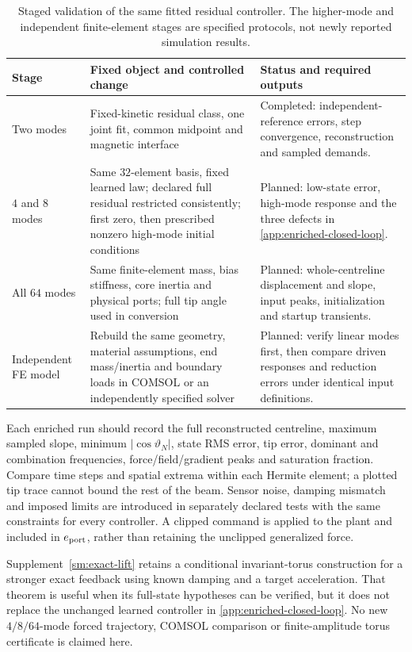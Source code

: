 \begin{table}[t]
\centering\small
\caption{Staged validation of the same fitted residual controller.
The higher-mode and independent finite-element stages are specified
protocols, not newly reported simulation results.}
\label{app:validation-stages}
\begin{tabular}{p{}p{}p{}}
\toprule
Stage & Fixed object and controlled change & Status and required outputs\\
\midrule
Two modes & Fixed-kinetic residual class, one joint fit, common midpoint and magnetic interface & Completed: independent-reference errors, step convergence, reconstruction and sampled demands.\\
$4$ and $8$ modes & Same $32$-element basis, fixed learned law; declared full residual restricted consistently; first zero, then prescribed nonzero high-mode initial conditions & Planned: low-state error, high-mode response and the three defects in \eqref{app:enriched-closed-loop}.\\
All $64$ modes & Same finite-element mass, bias stiffness, core inertia and physical ports; full tip angle used in conversion & Planned: whole-centreline displacement and slope, input peaks, initialization and startup transients.\\
Independent FE model & Rebuild the same geometry, material assumptions, end mass/inertia and boundary loads in COMSOL or an independently specified solver & Planned: verify linear modes first, then compare driven responses and reduction errors under identical input definitions.\\
\bottomrule
\end{tabular}
\end{table}

Each enriched run should record the full reconstructed centreline,
maximum sampled slope, minimum $|\cos\vartheta_N|$, state RMS error,
tip error, dominant and combination frequencies, force/field/gradient
peaks and saturation fraction. Compare time steps and spatial
extrema within each Hermite element; a plotted tip trace cannot bound
the rest of the beam. Sensor noise, damping mismatch and imposed
limits are introduced in separately declared tests with the same
constraints for every controller. A clipped command is applied to the
plant and included in $e_{\rm port}$, rather than retaining the
unclipped generalized force.

Supplement~\ref{sm:exact-lift} retains a conditional invariant-torus
construction for a stronger exact feedback using known damping and a
target acceleration. That theorem is useful when its full-state
hypotheses can be verified, but it does not replace the unchanged
learned controller in \eqref{app:enriched-closed-loop}. No new
$4/8/64$-mode forced trajectory, COMSOL comparison or finite-amplitude
torus certificate is claimed here.

